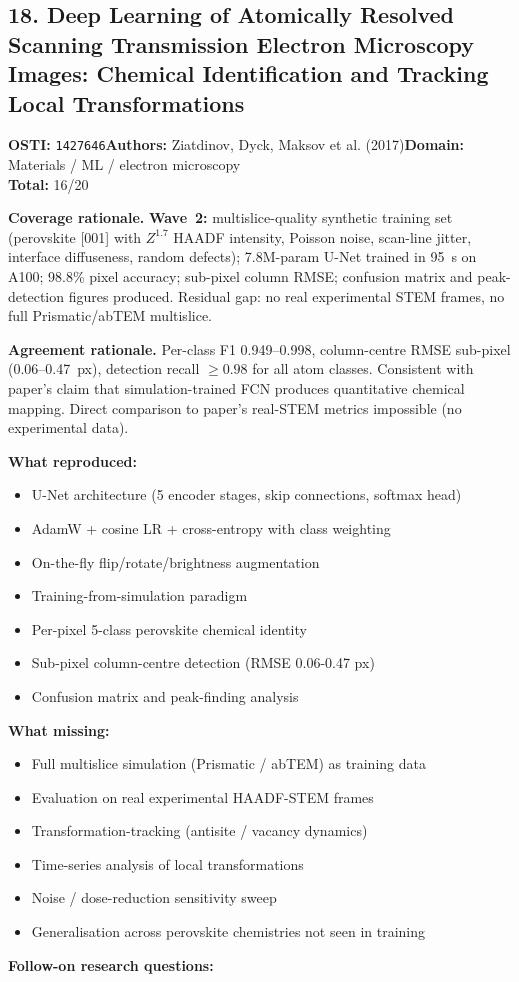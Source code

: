 \subsection{18. Deep Learning of Atomically Resolved Scanning Transmission Electron Microscopy Images: Chemical Identification and Tracking Local Transformations}
\textbf{OSTI:} \texttt{1427646}\quad\textbf{Authors:} Ziatdinov, Dyck, Maksov et al. (2017)\quad\textbf{Domain:} Materials / ML / electron microscopy\\
\quad{}\quad\textbf{Total:} 16/20\par\smallskip
\noindent\textbf{Coverage rationale.} \textbf{Wave~2:} multislice-quality synthetic training set (perovskite [001] with $Z^{1.7}$ HAADF intensity, Poisson noise, scan-line jitter, interface diffuseness, random defects); 7.8M-param U-Net trained in 95~s on A100; 98.8\% pixel accuracy; sub-pixel column RMSE; confusion matrix and peak-detection figures produced. Residual gap: no real experimental STEM frames, no full Prismatic/abTEM multislice.\par
\noindent\textbf{Agreement rationale.} Per-class F1 0.949--0.998, column-centre RMSE sub-pixel (0.06--0.47~px), detection recall $\geq 0.98$ for all atom classes. Consistent with paper's claim that simulation-trained FCN produces quantitative chemical mapping. Direct comparison to paper's real-STEM metrics impossible (no experimental data).\par\smallskip
\noindent\textbf{What reproduced:}
\begin{itemize}[leftmargin=1.4em,itemsep=0.2em,topsep=0.2em]
\item U-Net architecture (5 encoder stages, skip connections, softmax head)
\item AdamW + cosine LR + cross-entropy with class weighting
\item On-the-fly flip/rotate/brightness augmentation
\item Training-from-simulation paradigm
\item Per-pixel 5-class perovskite chemical identity
\item Sub-pixel column-centre detection (RMSE 0.06-0.47 px)
\item Confusion matrix and peak-finding analysis
\end{itemize}\noindent\textbf{What missing:}
\begin{itemize}[leftmargin=1.4em,itemsep=0.2em,topsep=0.2em]
\item Full multislice simulation (Prismatic / abTEM) as training data
\item Evaluation on real experimental HAADF-STEM frames
\item Transformation-tracking (antisite / vacancy dynamics)
\item Time-series analysis of local transformations
\item Noise / dose-reduction sensitivity sweep
\item Generalisation across perovskite chemistries not seen in training
\end{itemize}\noindent\textbf{Follow-on research questions:}
